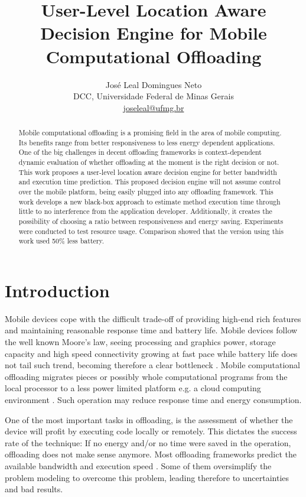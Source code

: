 \documentclass[10pt, conference, letterpaper]{IEEEtran}
\title{User-Level Location Aware Decision Engine for Mobile Computational Offloading}
\author{José Leal Domingues Neto \\ DCC, Universidade Federal de Minas Gerais \\ \href{mailto:joseleal@ufmg.br}{joseleal@ufmg.br}}
\begin{document}
\maketitle

\begin{abstract}
  Mobile computational offloading is a promising field in the area of mobile computing. Its benefits range from better responsiveness to less energy dependent applications. One of the big challenges in decent offloading frameworks is context-dependent dynamic evaluation of whether offloading at the moment is the right decision or not. This work proposes a user-level location aware decision engine for better bandwidth and execution time prediction. This proposed decision engine will not assume control over the mobile platform, being easily plugged into any offloading framework. This work develops a new black-box approach to estimate method execution time through little to no interference from the application developer. Additionally, it creates the possibility of choosing a ratio between responsiveness and energy saving. Experiments were conducted to test resource usage. Comparison showed that the version using this work used 50\% less battery.
\end{abstract}

\section{Introduction}
  Mobile devices cope with the difficult trade-off of providing high-end rich features and maintaining reasonable response time and battery life. Mobile devices follow the well known Moore's law, seeing processing and graphics power, storage capacity and high speed connectivity growing at fast pace while battery life does not tail such trend, becoming therefore a clear bottleneck \cite{Cuervo:2010:MMS:1814433.1814441}. Mobile computational offloading migrates pieces or possibly whole computational programs from the local processor to a less power limited platform e.g. a cloud computing environment \cite{Scavenger:5466972}. Such operation may reduce response time and energy consumption.  

  One of the most important tasks in offloading, is the assessment of whether the device will profit by executing code locally or remotely. This dictates the success rate of the technique: If no energy and/or no time were saved in the operation, offloading does not make sense anymore. Most offloading frameworks predict the available bandwidth and execution speed \cite{Cuervo:2010:MMS:1814433.1814441} \cite{Chun:2011:CEE:1966445.1966473} \cite{Shi:2014:CCO:2632951.2632958}. Some of them oversimplify the problem modeling to overcome this problem, leading therefore to uncertainties and bad results.
  
\end{document}
